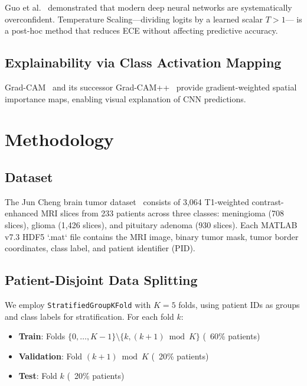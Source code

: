 \documentclass[journal]{IEEEtran}
\begin{document}
Guo et al.~\cite{guo2017calibration} demonstrated that modern deep neural networks are
systematically overconfident. Temperature Scaling—dividing logits by a learned scalar $T > 1$—
is a post-hoc method that reduces ECE without affecting predictive accuracy.

\subsection{Explainability via Class Activation Mapping}

Grad-CAM~\cite{selvaraju2017gradcam} and its successor Grad-CAM++~\cite{chattopadhay2018gradcampp}
provide gradient-weighted spatial importance maps, enabling visual explanation of CNN predictions.

\section{Methodology}
\label{sec:method}

\subsection{Dataset}

The Jun Cheng brain tumor dataset~\cite{cheng2015enhanced} consists of 3,064 T1-weighted
contrast-enhanced MRI slices from 233 patients across three classes:
meningioma (708 slices), glioma (1,426 slices), and pituitary adenoma (930 slices).
Each MATLAB v7.3 HDF5 `.mat` file contains the MRI image, binary tumor mask, tumor border
coordinates, class label, and patient identifier (PID).

\subsection{Patient-Disjoint Data Splitting}

We employ \texttt{StratifiedGroupKFold} with $K=5$ folds, using patient IDs as groups
and class labels for stratification. For each fold $k$:
\begin{itemize}
  \item \textbf{Train}: Folds $\{0,\ldots,K-1\} \setminus \{k, (k+1) \bmod K\}$ (~60\% patients)
  \item \textbf{Validation}: Fold $(k+1) \bmod K$ (~20\% patients)
  \item \textbf{Test}: Fold $k$ (~20\% patients)
\end{itemize}
\end{document}
